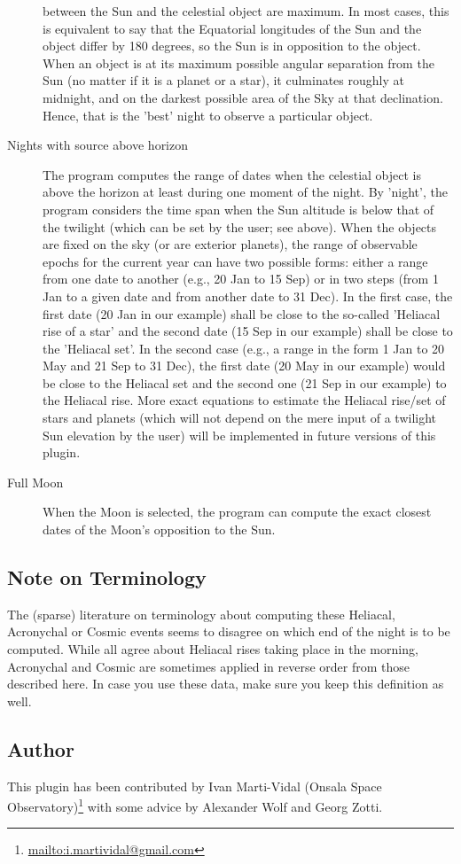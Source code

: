 \begin{description}
  between the Sun and the celestial object are maximum. In most cases,
  this is equivalent to say that the Equatorial longitudes of the Sun
  and the object differ by 180 degrees, so the Sun is in opposition to
  the object. When an object is at its maximum possible angular
  separation from the Sun (no matter if it is a planet or a star), it
  culminates roughly at midnight, and on the darkest possible area of
  the Sky at that declination. Hence, that is the 'best' night to
  observe a particular object.
\item[Nights with source above horizon] The program computes the range
  of dates when the celestial object is above the horizon at least
  during one moment of the night. By 'night', the program considers
  the time span when the Sun altitude is below that of the twilight
  (which can be set by the user; see above). When the objects are
  fixed on the sky (or are exterior planets), the range of observable
  epochs for the current year can have two possible forms: either a
  range from one date to another (e.g., 20 Jan to 15 Sep) or in two
  steps (from 1 Jan to a given date and from another date to 31
  Dec). In the first case, the first date (20 Jan in our example)
  shall be close to the so-called 'Heliacal rise of a star' and the
  second date (15 Sep in our example) shall be close to the 'Heliacal
  set'. In the second case (e.g., a range in the form 1 Jan to 20 May
  and 21 Sep to 31 Dec), the first date (20 May in our example) would
  be close to the Heliacal set and the second one (21 Sep in our
  example) to the Heliacal rise. More exact equations to estimate the
  Heliacal rise/set of stars and planets (which will not depend on the
  mere input of a twilight Sun elevation by the user) will be
  implemented in future versions of this plugin.
\item[Full Moon] When the Moon is selected, the program can compute
  the exact closest dates of the Moon's opposition to the Sun.
\end{description}

\subsection*{Note on Terminology}

The (sparse) literature on terminology about computing these Heliacal, Acronychal or Cosmic events 
seems to disagree on which end of the night is to be computed. While all agree about 
Heliacal rises taking place in the morning, Acronychal and Cosmic are sometimes applied 
in reverse order from those described here. In case you use these data, make sure you 
keep this definition as well. 

\subsection*{Author}
\label{sec:plugins:Observability:author}
This plugin has been contributed by Ivan Marti-Vidal (Onsala Space Observatory)\footnote{\url{mailto:i.martividal@gmail.com}} with some advice by Alexander Wolf and Georg Zotti.





